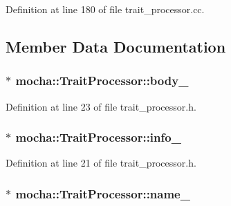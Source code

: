 Definition at line 180 of file trait\_\-processor.cc.



\subsection{Member Data Documentation}
\hypertarget{classmocha_1_1_trait_processor_adee805716650a09bc1b81f79686e47fe}{
\subsubsection[{body\_\-}]{$\ast$ {\bf mocha::TraitProcessor::body\_\-}}}
\label{classmocha_1_1_trait_processor_adee805716650a09bc1b81f79686e47fe}


Definition at line 23 of file trait\_\-processor.h.

\hypertarget{classmocha_1_1_trait_processor_a90d1c88f5a7a093a2cfb2306e989769c}{
\subsubsection[{info\_\-}]{$\ast$ {\bf mocha::TraitProcessor::info\_\-}}}
\label{classmocha_1_1_trait_processor_a90d1c88f5a7a093a2cfb2306e989769c}


Definition at line 21 of file trait\_\-processor.h.

\hypertarget{classmocha_1_1_trait_processor_ab927330496a78fef533aa1c5cb6eb745}{
\subsubsection[{name\_\-}]{$\ast$ {\bf mocha::TraitProcessor::name\_\-}}}
\label{classmocha_1_1_trait_processor_ab927330496a78fef533aa1c5cb6eb745}


